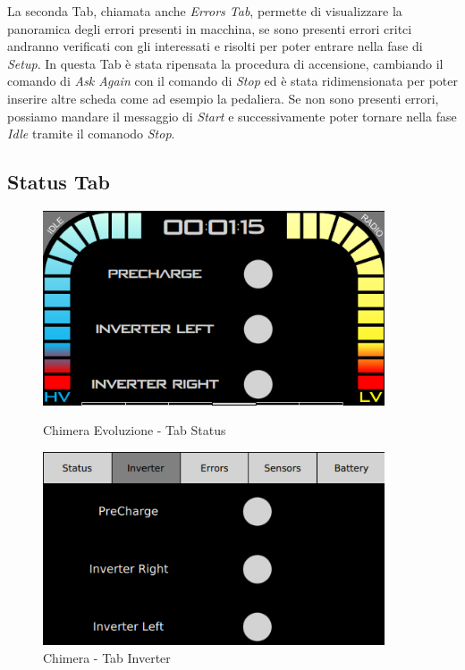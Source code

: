 La seconda Tab, chiamata anche \emph{Errors Tab}, permette di visualizzare la panoramica degli errori presenti in macchina, 
se sono presenti errori critci andranno verificati con gli interessati e risolti per poter entrare nella fase di \emph{Setup}.
In questa Tab è stata ripensata la procedura di accensione, cambiando il comando di \emph{Ask Again} con il comando di \emph{Stop}
ed è stata ridimensionata per poter inserire altre scheda come ad esempio la pedaliera.
Se non sono presenti errori, possiamo mandare il messaggio di \emph{Start} e successivamente poter tornare nella fase \emph{Idle}
tramite il comanodo \emph{Stop}.


\newpage


\subsection{Status Tab}

\begin{figure}[h!]
    \centering
    \begin{minipage}{0.5\textwidth}
        \centering
        \includegraphics[width=0.9\textwidth]{./figures/UI/tabStatus.png}
        \caption{Chimera Evoluzione - Tab Status}    
    \end{minipage}\hfill
    \begin{minipage}{0.5\textwidth}
        \centering
        \includegraphics[width=0.9\textwidth]{./figures/oldUI/tabInverter.png}
        \caption{Chimera - Tab Inverter}
    \end{minipage}
\end{figure}

